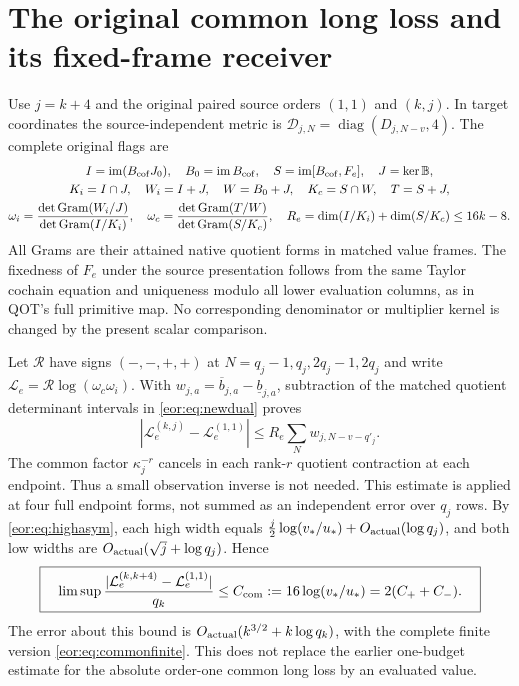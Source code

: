 \documentclass[11pt,a4paper]{article}
\DeclareMathOperator{\im}{im}
\DeclareMathOperator{\Gr}{Gram}
\begin{document}
\section{The original common long loss and its fixed-frame receiver}
Use $j=k+4$ and the original paired source orders $(1,1)$ and $(k,j)$.
In target coordinates the source-independent metric is
$\mathcal D_{j,N}=\operatorname{diag}(D_{j,N-v},4)$.
The complete original flags are
\begin{equation}
\begin{gathered}
 I=\im(B_{\rm cof}J_0),\quad B_0=\im B_{\rm cof},\quad
 S=\im[B_{\rm cof},F_e],\quad J=\ker\mathbb B,\\
 K_i=I\cap J,\quad W_i=I+J,\quad W=B_0+J,\quad
 K_c=S\cap W,\quad T=S+J,\\
 \omega_i=\frac{\det\Gr(W_i/J)}{\det\Gr(I/K_i)},\quad
 \omega_c=\frac{\det\Gr(T/W)}{\det\Gr(S/K_c)},\quad
 R_e=\dim(I/K_i)+\dim(S/K_c)\le16k-8.
\end{gathered}\label{eor:eq:flags}
\end{equation}
All Grams are their attained native quotient forms in matched value frames.
The fixedness of $F_e$ under the source presentation follows from the same
Taylor cochain equation and uniqueness modulo all lower evaluation columns,
as in QOT's full primitive map. No corresponding denominator or multiplier
kernel is changed by the present scalar comparison.

Let $\mathcal R$ have signs $(-,-,+,+)$ at
$N=q_j-1,q_j,2q_j-1,2q_j$ and write
$\mathcal L_e=\mathcal R\log(\omega_c\omega_i)$.
With $w_{j,a}=\overline b_{j,a}-\underline b_{j,a}$, subtraction of the
matched quotient determinant intervals in \eqref{eor:eq:newdual} proves
\begin{equation}
 \boxed{\quad
 |\mathcal L_e^{(k,j)}-\mathcal L_e^{(1,1)}|
       \le R_e\sum_Nw_{j,N-v-q'_j}.
 \quad}\label{eor:eq:commonfinite}
\end{equation}
The common factor $\kappa_j^{-r}$ cancels in each rank-$r$ quotient contraction
at each endpoint. Thus a small observation inverse is not needed. This estimate
is applied at four full endpoint forms, not summed as an independent error over
$q_j$ rows.
By \eqref{eor:eq:highasym}, each high width equals
$\frac j2\log(v_*/u_*)+O_{\rm actual}(\log q_j)$, and both low widths are
$O_{\rm actual}(\sqrt j+\log q_j)$. Hence
\begin{equation}
 \boxed{\quad
 \limsup\frac{|\mathcal L_e^{(k,k+4)}-\mathcal L_e^{(1,1)}|}{q_k}
 \le C_{\rm com}:=16\log(v_*/u_*)=2(C_++C_-).
 \quad}\label{eor:eq:commonlimit}
\end{equation}
The error about this bound is $O_{\rm actual}(k^{3/2}+k\log q_k)$,
with the complete finite version \eqref{eor:eq:commonfinite}.
This does not replace the earlier one-budget estimate for the absolute
order-one common long loss by an evaluated value.
\end{document}
